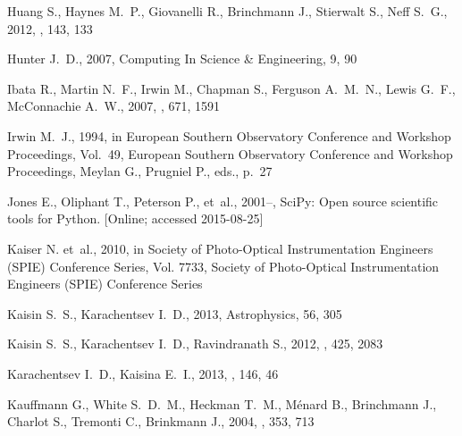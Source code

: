 \documentclass[usenatbib]{mn2e}
\begin{document}
\begin{thebibliography}{157}
{Huang} S., {Haynes} M.~P., {Giovanelli} R., {Brinchmann} J., {Stierwalt} S.,
  {Neff} S.~G., 2012{}, \aj, 143, 133

Hunter J.~D., 2007, Computing In Science \& Engineering, 9, 90

{Ibata} R., {Martin} N.~F., {Irwin} M., {Chapman} S., {Ferguson} A.~M.~N.,
  {Lewis} G.~F., {McConnachie} A.~W., 2007, \apj, 671, 1591

{Irwin} M.~J., 1994, in European Southern Observatory Conference and Workshop
  Proceedings, Vol.~49, European Southern Observatory Conference and Workshop
  Proceedings, {Meylan} G., {Prugniel} P., eds., p.~27

Jones E., Oliphant T., Peterson P., {et~al.}, 2001--, {SciPy}: Open source
  scientific tools for {Python}. [Online; accessed 2015-08-25]

{Kaiser} N. {et~al.}, 2010, in Society of Photo-Optical Instrumentation
  Engineers (SPIE) Conference Series, Vol. 7733, Society of Photo-Optical
  Instrumentation Engineers (SPIE) Conference Series

{Kaisin} S.~S., {Karachentsev} I.~D., 2013, Astrophysics, 56, 305

{Kaisin} S.~S., {Karachentsev} I.~D., {Ravindranath} S., 2012, \mnras, 425,
  2083

{Karachentsev} I.~D., {Kaisina} E.~I., 2013, \aj, 146, 46

{Kauffmann} G., {White} S.~D.~M., {Heckman} T.~M., {M{\'e}nard} B.,
  {Brinchmann} J., {Charlot} S., {Tremonti} C., {Brinkmann} J., 2004, \mnras,
  353, 713


\end{thebibliography}
\end{document}
